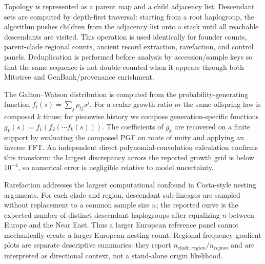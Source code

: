 \documentclass[11pt]{article}
\begin{document}
Topology is represented as a parent map and a child adjacency list. Descendant sets are computed by depth-first traversal: starting from a root haplogroup, the algorithm pushes children from the adjacency list onto a stack until all reachable descendants are visited. This operation is used identically for founder counts, parent-clade regional counts, ancient record extraction, rarefaction, and control panels. Deduplication is performed before analysis by accession/sample keys so that the same sequence is not double-counted when it appears through both Mitotree and GenBank/provenance enrichment.

The Galton--Watson distribution is computed from the probability-generating function $f_t(s)=\sum_j p_{tj}s^j$. For a scalar growth ratio $m$ the same offspring law is composed $k$ times; for piecewise history we compose generation-specific functions $g_k(s)=f_1(f_2(\cdots f_k(s)))$. The coefficients of $g_k$ are recovered on a finite support by evaluating the composed PGF on roots of unity and applying an inverse FFT. An independent direct polynomial-convolution calculation confirms this transform: the largest discrepancy across the reported growth grid is below $10^{-4}$, so numerical error is negligible relative to model uncertainty.

Rarefaction addresses the largest computational confound in Costa-style nesting arguments. For each clade and region, descendant sub-lineages are sampled without replacement to a common sample size $n$; the reported curve is the expected number of distinct descendant haplogroups after equalizing $n$ between Europe and the Near East. Thus a larger European reference panel cannot mechanically create a larger European nesting count. Regional frequency-gradient plots are separate descriptive summaries: they report $n_{clade,region}/n_{region}$ and are interpreted as directional context, not a stand-alone origin likelihood.
\end{document}
